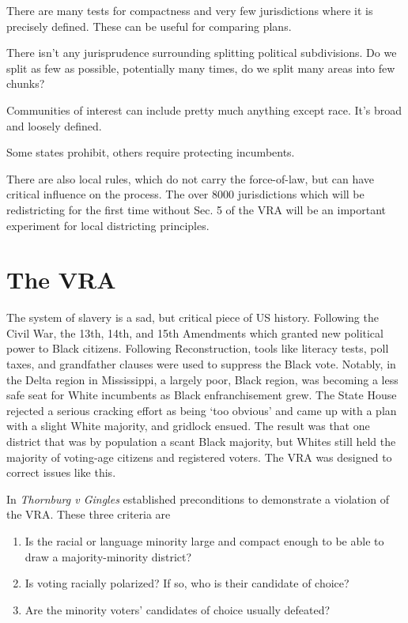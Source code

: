 There are many tests for compactness and very few jurisdictions where it is precisely defined.  These can be useful for comparing plans.

There isn't any jurisprudence surrounding splitting political subdivisions.  Do we split as few as possible, potentially many times, do we split many areas into few chunks?

Communities of interest can include pretty much anything except race.  It's broad and loosely defined.

Some states prohibit, others require protecting incumbents.

There are also local rules, which do not carry the force-of-law, but can have critical influence on the process.  The over 8000 jurisdictions which will be redistricting for the first time without Sec. 5 of the VRA will be an important experiment for local districting principles.

\section*{The VRA}

The system of slavery is a sad, but critical piece of US history.  Following the Civil War, the 13th, 14th, and 15th Amendments which granted new political power to Black citizens.  Following Reconstruction, tools like literacy tests, poll taxes, and grandfather clauses were used to suppress the Black vote.  Notably, in the Delta region in Mississippi, a largely poor, Black region, was becoming a less safe seat for White incumbents as Black enfranchisement grew.  The State House rejected a serious cracking effort as being `too obvious' and came up with a plan with a slight White majority, and gridlock ensued.  The result was that one district that was by population a scant Black majority, but Whites still held the majority of voting-age citizens and registered voters.  The VRA was designed to correct issues like this.


In \textit{Thornburg v Gingles} established preconditions to demonstrate a violation of the VRA.  These three criteria are

\begin{enumerate}
	\item Is the racial or language minority large and compact enough to be able to draw a majority-minority district?
	\item Is voting racially polarized?  If so, who is their candidate of choice?
	\item Are the minority voters' candidates of choice usually defeated?
  \end{enumerate}
  
